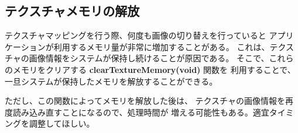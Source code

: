 % 
% 

\subsection{テクスチャメモリの解放}
テクスチャマッピングを行う際、何度も画像の切り替えを行っていると
アプリケーションが利用するメモリ量が非常に増加することがある。
これは、テクスチャの画像情報をシステムが保持し続けることが原因である。
そこで、これらのメモリをクリアする \textbf{clearTextureMemory(void)} 関数を
利用することで、一旦システムが保持したメモリを解放することができる。

ただし、この関数によってメモリを解放した後は、
テクスチャの画像情報を再度読み込み直すことになるので、処理時間が
増える可能性もある。適宜タイミングを調整してほしい。

